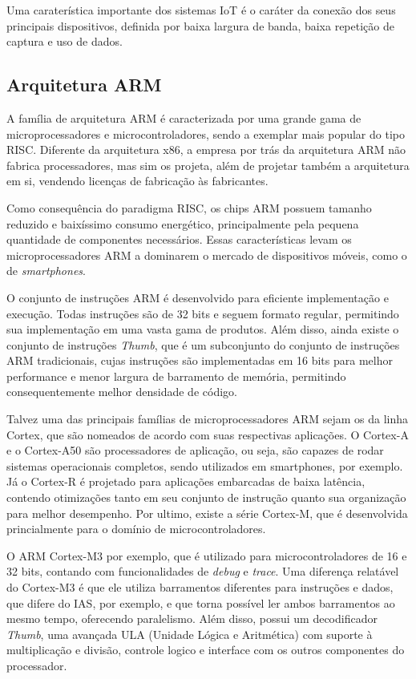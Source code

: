 \documentclass{article}
\begin{document}
Uma caraterística importante dos sistemas IoT é o caráter da conexão dos seus
principais dispositivos, definida por baixa largura de banda, baixa repetição de
captura e uso de dados.

\subsection{Arquitetura ARM} 
A família de arquitetura ARM é caracterizada por uma grande gama de
microprocessadores e microcontroladores, sendo a exemplar mais popular do tipo
RISC. Diferente da arquitetura x86, a empresa por trás da arquitetura ARM não
fabrica processadores, mas sim os projeta, além de projetar também a arquitetura
em si, vendendo licenças de fabricação às fabricantes.

Como consequência do paradigma RISC, os chips ARM possuem tamanho reduzido e
baixíssimo consumo energético, principalmente pela pequena quantidade de
componentes necessários. Essas características levam os microprocessadores ARM a
dominarem o mercado de dispositivos móveis, como o de \textit{smartphones}.

O conjunto de instruções ARM é desenvolvido para eficiente implementação e
execução. Todas instruções são de 32 bits e seguem formato regular, permitindo
sua implementação em uma vasta gama de produtos. Além disso, ainda existe o
conjunto de instruções \textit{Thumb}, que é um subconjunto do conjunto de
instruções ARM tradicionais, cujas instruções são implementadas em 16 bits para
melhor performance e menor largura de barramento de memória, permitindo
consequentemente melhor densidade de código.

Talvez uma das principais famílias de microprocessadores ARM sejam os da linha
Cortex, que são nomeados de acordo com suas respectivas aplicações. O Cortex-A
e o Cortex-A50 são processadores de aplicação, ou seja, são capazes de rodar sistemas
operacionais completos, sendo utilizados em smartphones, por exemplo. Já o
Cortex-R é projetado para aplicações embarcadas de baixa latência, contendo
otimizações tanto em seu conjunto de instrução quanto sua organização para
melhor desempenho. Por ultimo, existe a série Cortex-M, que é desenvolvida
princialmente para o domínio de microcontroladores.

O ARM Cortex-M3 por exemplo, que é utilizado para microcontroladores de 16 e 32
bits, contando com funcionalidades de \textit{debug} e \textit{trace}. Uma
diferença relatável do Cortex-M3 é que ele utiliza barramentos diferentes para
instruções e dados, que difere do IAS, por exemplo, e que torna possível ler
ambos barramentos ao mesmo tempo, oferecendo paralelismo. Além disso, possui um
decodificador \textit{Thumb}, uma avançada ULA (Unidade Lógica e Aritmética)
com suporte à multiplicação e divisão, controle logico e interface com os outros
componentes do processador.
\end{document}
